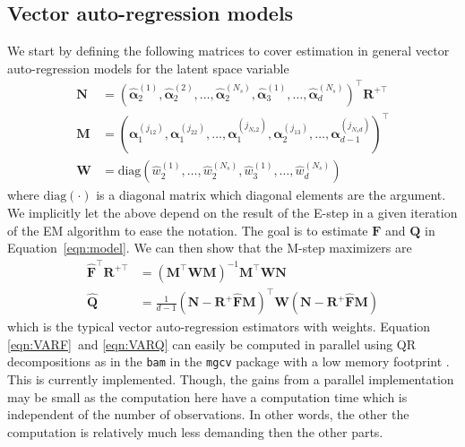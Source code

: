 \documentclass[notitlepage]{article}
\renewcommand{\vec}[1]{\bm{#1}}
\newcommand{\mat}[1]{\mathbf{#1}}
\newcommand{\Lparen}[1]{\left( #1\right)}
\newcommand{\optor}[2]{#1\Lparen{#2}}
\newcommand{\diag}[1]{\optor{\text{diag}}{#1}}
\newcommand{\partic}[3]{#1_{#2}^{\Lparen{#3}}}
\newcommand{\particS}[3]{\widehat{#1}_{#2}^{\Lparen{#3}}}
\newcommand{\nPart}{N}
\newcommand{\nPeriods}{d}
\begin{document}
\subsection{Vector auto-regression models}\label{subsec:VAR}
We start by defining the following matrices to cover estimation in general vector auto-regression models for the latent space variable %
%
\begin{align*}
\mat{N} &= \Lparen{
    	\particS{\vec{\alpha}}{2}{1}, 
    	\particS{\vec{\alpha}}{2}{2},
    	\dots, 
    	\particS{\vec{\alpha}}{2}{\nPart_s}, 
    	\particS{\vec{\alpha}}{3}{1},
    	\dots, 
   		\particS{\vec{\alpha}}{\nPeriods}{\nPart_s}
	}^\top\mat{R}^{+\top} \\
%
\mat{M} &= \Lparen{
    	\partic{\vec{\alpha}}{1}{j_{12}}, 
    	\partic{\vec{\alpha}}{1}{j_{22}},
    	\dots, 
    	\partic{\vec{\alpha}}{1}{j_{\nPart_s2}}, 
    	\partic{\vec{\alpha}}{2}{j_{13}},
    	\dots, 
   		\partic{\vec{\alpha}}{\nPeriods - 1}{j_{\nPart_s\nPeriods}}
	}^\top \\
%
\mat{W} &= \diag{
		\particS{w}{2}{1}, \dots, \particS{w}{2}{\nPart_s},
		\particS{w}{3}{1}, \dots,
		\particS{w}{\nPeriods}{\nPart_s}
	}
\end{align*}%
% 
where $\diag{\cdot}$ is a diagonal matrix which diagonal elements are the argument. We implicitly let the above depend on the result of the E-step in a given iteration of the EM algorithm to ease the notation. The goal is to estimate $\mat{F}$ and $\mat{Q}$ in Equation~\eqref{eqn:model}. We can then show that the M-step maximizers are%
% 
\begin{align}
\widehat{\mat{F}}^\top\mat{R}^{+\top} &=
	\Lparen{\mat{M}^\top\mat{W}\mat{M}}^{-1}	
	\mat{M}^\top\mat{W}\mat{N} \label{eqn:VARF} \\
%
\widehat{\mat{Q}} &= 
	\frac{1}{\nPeriods - 1}
	\Lparen{\mat{N} - \mat{R}^+\widehat{\mat{F}}\mat{M}}^\top
	\mat{W}
	\Lparen{\mat{N} - \mat{R}^+\widehat{\mat{F}}\mat{M}} \label{eqn:VARQ}
\end{align}%
%
which is the typical vector auto-regression estimators with weights. Equation \eqref{eqn:VARF}~and \eqref{eqn:VARQ} can easily be computed in parallel using QR decompositions as in the \texttt{bam} in the \texttt{mgcv} package with a low memory footprint \citep[see][]{wood14}. This is currently implemented. Though, the gains from a parallel implementation may be small as the computation here have a computation time which is independent of the number of observations. In other words, the other the computation is relatively much less demanding then the other parts.
\end{document}
